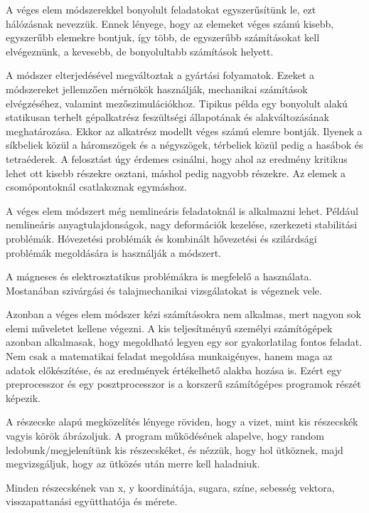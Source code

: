 
A véges elem módszerekkel
bonyolult feladatokat egyszerűsítünk le, ezt hálózásnak nevezzük. Ennek lényege, hogy az elemeket véges számú kisebb, egyszerűbb elemekre bontjuk, így több, de egyszerűbb számításokat kell elvégeznünk, a kevesebb, de bonyolultabb számítások helyett.


A módszer elterjedésével megváltoztak a gyártási folyamatok. Ezeket a módszereket jellemzően mérnökök használják, mechanikai számítások elvégzéséhez, valamint mezőszimulációkhoz. Tipikus példa egy bonyolult alakú statikusan terhelt gépalkatrész feszültségi állapotának és alakváltozásának meghatározása. Ekkor az alkatrész modellt véges számú elemre bontják. Ilyenek a síkbeliek közül a háromszögek és a négyszögek, térbeliek közül pedig a hasábok és tetraéderek. A felosztást úgy érdemes csinálni, hogy ahol az eredmény kritikus lehet ott kisebb részekre osztani, máshol pedig nagyobb részekre. Az elemek a csomópontoknál csatlakoznak egymáshoz. 


A véges elem módszert még nemlineáris feladatoknál is alkalmazni lehet. Például nemlineáris anyagtulajdonságok, nagy deformációk kezelése, szerkezeti stabilitási problémák. Hóvezetési problémák és kombinált hővezetési és szilárdsági problémák megoldására is használják a módszert. 


A mágneses és elektrosztatikus problémákra is megfelelő a használata. Mostanában szivárgási és talajmechanikai vizsgálatokat is végeznek vele. 

Azonban a véges elem módszer kézi számításokra nem alkalmas, mert nagyon sok elemi műveletet kellene végezni. A kis teljesítményű személyi számítógépek azonban alkalmasak, hogy megoldható legyen egy sor gyakorlatilag fontos feladat. Nem csak a matematikai feladat megoldása munkaigényes, hanem maga az adatok előkészítése, és az eredmények értékelhető alakba hozása is. Ezért egy preprocesszor és egy posztprocesszor is a korszerű számítógépes programok részét képezik.   






A részecske alapú megközelítés lényege röviden, hogy a vizet, mint kis részecskék vagyis körök ábrázoljuk. A program működésének alapelve, hogy random ledobunk/megjelenítünk kis részecskéket, és nézzük, hogy hol ütköznek, majd megvizsgáljuk, hogy az ütközés után merre kell haladniuk. 

Minden részecskének van x, y koordinátája, sugara, színe, sebesség vektora, visszapattanási együtthatója és mérete. 


